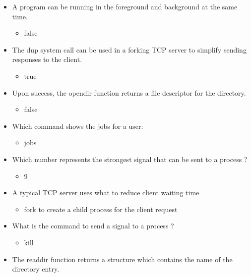 \documentclass{report}
\begin{document}
    \pagebreak 
    \begin{itemize}
        \item A program can be running in the foreground and background at the same time.
            \begin{itemize}
                \item false
            \end{itemize}
        \item The dup system call can be used in a forking TCP server to simplify sending responses to the client.
            \begin{itemize}
                \item true 
            \end{itemize}
        \item Upon success, the opendir function returns a file descriptor for the directory.
            \begin{itemize}
                \item false 
            \end{itemize}
        \item Which command shows the jobs for a user:
            \begin{itemize}
                \item jobs 
            \end{itemize}
        \item Which number represents the strongest signal that can be sent to a process ?
            \begin{itemize}
                \item 9  
            \end{itemize}
        \item A typical TCP server uses what to reduce client waiting time
            \begin{itemize}
                \item  fork to create a child process for the client request 
            \end{itemize}
        \item What is the command to send a signal to a process ?
            \begin{itemize}
                \item kill 
            \end{itemize}
        \item The readdir function returns a structure which contains the name of the directory entry.
            \begin{itemize}

\end{itemize}
\end{itemize}
\end{document}
